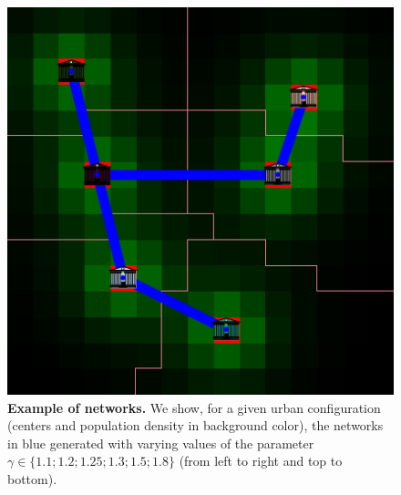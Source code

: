 \documentclass[runningheads,a4paper]{llncs2e/llncs}
\begin{document}
\begin{figure}[h!]
	\includegraphics[width=0.32\linewidth]{figures/bionw_territ6_gamma1_8.png}
	\caption{\textbf{Example of networks.} We show, for a given urban configuration (centers and population density in background color), the networks in blue generated with varying values of the parameter $\gamma \in \{1.1 ; 1.2 ; 1.25 ; 1.3 ; 1.5 ; 1.8 \}$ (from left to right and top to bottom).\label{fig:exnw}}
\end{figure}






\end{document}

